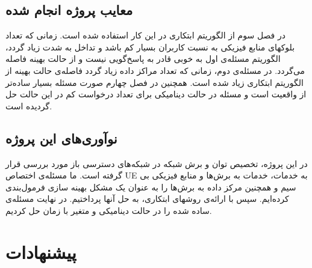  \subsection{معایب  پروژه انجام شده}
 در فصل سوم از الگوریتم ابتکاری در این کار استفاده شده است. زمانی که تعداد بلوکهای منابع فیزیکی به نسبت کاربران بسیار کم باشد و تداخل به شدت زیاد گردد، الگوریتم مسئله‌ی اول به خوبی قادر به پاسخ‌گویی نیست و از حالت بهینه فاصله ‌می‌گردد. در مسئله‌ی دوم، زمانی که تعداد مراکز داده زیاد گردد فاصله‌ی حالت بهینه از الگوریتم ابتکاری زیاد شده است. 
همچنین در فصل چهارم صورت مسئله بسیار ساده‌تر از واقعیت است و مسئله در حالت دینامیکی برای تعداد درخواست کم در این حالت حل گردیده است.
 \subsection{نوآوری‌های این پروژه}
 در این پروژه، تخصیص توان و برش شبکه در شبکه‌های دسترسی باز مورد بررسی قرار گرفته است.
 ما مسئله‌ی اختصاص UE به خدمات، خدمات به برش‌ها و منابع فیزیکی بی سیم و همچنین مرکز داده به برش‌ها را به عنوان یک مشکل بهینه سازی فرمول‌بندی کرده‌ایم. سپس با ارائه‌ی روشهای ابتکاری، به حل آنها پرداختیم. در نهایت مسئله‌ی ساده شده را در حالت دینامیکی و متغیر با زمان حل کردیم.
 \section{پیشنهادات}
 
